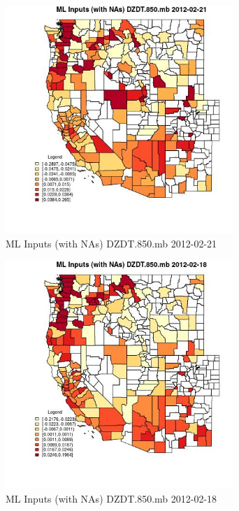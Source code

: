 \begin{figure} 
\centering  
\includegraphics[width=0.77\textwidth]{Code_Outputs/Report_ML_input_PM25_Step4_part_f_de_duplicated_aveswNAs_CountyDZDT850mbMean2012-02-21.jpg} 
\caption{\label{fig:Report_ML_input_PM25_Step4_part_f_de_duplicated_aveswNAsCountyDZDT850mbMean2012-02-21}ML Inputs (with NAs) DZDT.850.mb 2012-02-21} 
\end{figure} 
 

\clearpage 

\begin{figure} 
\centering  
\includegraphics[width=0.77\textwidth]{Code_Outputs/Report_ML_input_PM25_Step4_part_f_de_duplicated_aveswNAs_CountyDZDT850mbMean2012-02-18.jpg} 
\caption{\label{fig:Report_ML_input_PM25_Step4_part_f_de_duplicated_aveswNAsCountyDZDT850mbMean2012-02-18}ML Inputs (with NAs) DZDT.850.mb 2012-02-18} 
\end{figure} 
 

